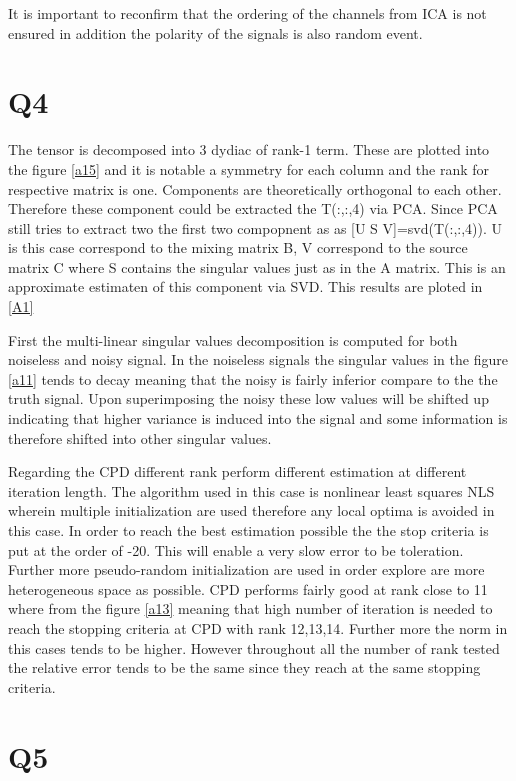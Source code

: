 It is important to reconfirm that the ordering of the channels from ICA is not ensured in addition the polarity of the signals is also random event.

\section{Q4}

The tensor is decomposed into 3 dydiac of rank-1 term. These are plotted into the figure \ref{a15} and it is notable a symmetry for each column and the rank for respective matrix is one. Components are theoretically orthogonal to each other. Therefore these component could be extracted the  T(:,:,4) via PCA. Since PCA still tries to extract two the first two compopnent as as [U S V]=svd(T(:,:,4)). U is this case correspond to the mixing matrix B, V correspond to the source matrix C where S contains the singular values just as in the A matrix. This is an approximate estimaten of this component via SVD. This results are ploted in \ref{A1}

First the multi-linear singular values decomposition is computed for both noiseless and noisy signal. In the noiseless signals the singular values in the figure \ref{a11} tends to decay meaning that the noisy is fairly inferior compare to the the truth signal. Upon superimposing the noisy these low values will be shifted up indicating that higher variance is induced into the signal and some information is therefore shifted into other singular values. 

Regarding the CPD different rank perform different estimation at different iteration length. The algorithm used in this case is nonlinear least squares NLS wherein multiple initialization are used therefore any local optima is avoided in this case. In order to reach the best estimation possible the the stop criteria is put at the order of -20. This will enable a very slow error to be toleration. Further more pseudo-random initialization are used in order explore are more heterogeneous space as possible. CPD performs fairly good at rank close to 11 where from the figure \ref{a13} meaning that high number of iteration is needed to reach the stopping criteria at CPD with rank 12,13,14. Further more the norm in this cases tends to be higher. However throughout all the number of rank tested the relative error tends to be the same since they reach at the same stopping criteria. 



\section{Q5}

